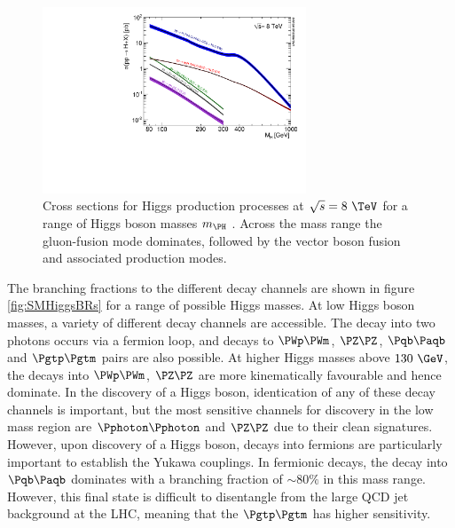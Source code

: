 \begin{figure}[htbp]
   \includegraphics[width=0.7\textwidth]{plots/theory/Higgs_XS_8TeV_lx.pdf}
\caption{Cross sections for Higgs production processes at $\sqrt{s}=8~\TeV$ for
a range of Higgs boson masses $m_{\PH}$ \cite{Heinemeyer:2013tqa}. Across the
mass range the gluon-fusion mode dominates, followed by the vector boson fusion
and associated production modes.}
\label{fig:SMHiggsXS}
\end{figure}

The branching fractions to the different decay channels are shown in
figure \ref{fig:SMHiggsBRs} for a range of possible Higgs masses. At low Higgs
boson masses, a variety of different decay channels are accessible. The decay
into two photons occurs via a fermion loop, and decays to $\PWp\PWm$, $\PZ\PZ$,
$\Pqb\Paqb$ and $\Pgtp\Pgtm$ pairs are also possible. At higher Higgs masses
above $130~\GeV$, the decays into $\PWp\PWm$, $\PZ\PZ$ are more kinematically
favourable and hence dominate. In the discovery of a Higgs boson, identication of
any of these decay channels is important, but the most sensitive channels for
discovery in the low mass region are $\Pphoton\Pphoton$ and $\PZ\PZ$ due to
their clean signatures. However, upon discovery of a Higgs boson, decays into 
fermions are particularly important
to establish the Yukawa couplings. In fermionic decays, the decay into
$\Pqb\Paqb$ dominates with a branching fraction of $\sim 80\%$ in this mass
range. However, this final state is difficult to disentangle from the large QCD
jet background at the LHC, meaning that the $\Pgtp\Pgtm$ has higher sensitivity.

